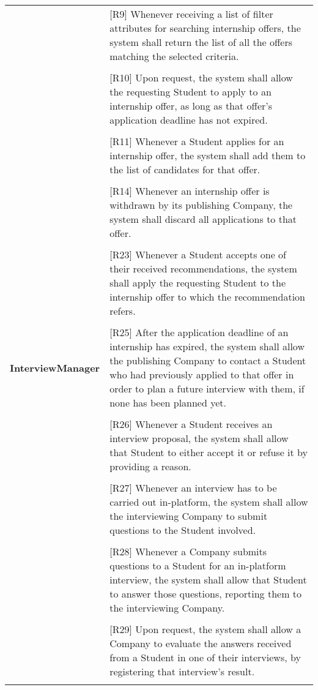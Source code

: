 \begin{center}
\begin{longtable}{p{0.3\linewidth}p{0.7\linewidth}}
        & [R9] Whenever receiving a list of filter attributes for searching internship offers, the system shall return the list of all the offers matching the selected criteria. \\ \\
        & [R10] Upon request, the system shall allow the requesting Student to apply to an internship offer, as long as that offer’s application deadline has not expired. \\ \\
        & [R11] Whenever a Student applies for an internship offer, the system shall add them to the list of candidates for that offer. \\ \\
        & [R14] Whenever an internship offer is withdrawn by its publishing Company, the system shall discard all applications to that offer. \\ \\
        & [R23] Whenever a Student accepts one of their received recommendations, the system shall apply the requesting Student to the internship offer to which the recommendation refers. \\ \\
        \hline
        \textbf{InterviewManager}           & [R25] After the application deadline of an internship has expired, the system shall allow the publishing Company to contact a Student who had previously applied to that offer in order to plan a future interview with them, if none has been planned yet. \\ \\
        & [R26] Whenever a Student receives an interview proposal, the system shall allow that Student to either accept it or refuse it by providing a reason. \\ \\
        & [R27] Whenever an interview has to be carried out in-platform, the system shall allow the interviewing Company to submit questions to the Student involved. \\ \\
        & [R28] Whenever a Company submits questions to a Student for an in-platform interview, the system shall allow that Student to answer those questions, reporting them to the interviewing Company. \\ \\
        & [R29] Upon request, the system shall allow a Company to evaluate the answers received from a Student in one of their interviews, by registering that interview’s result. \\ \\

\end{longtable}
\end{center}
